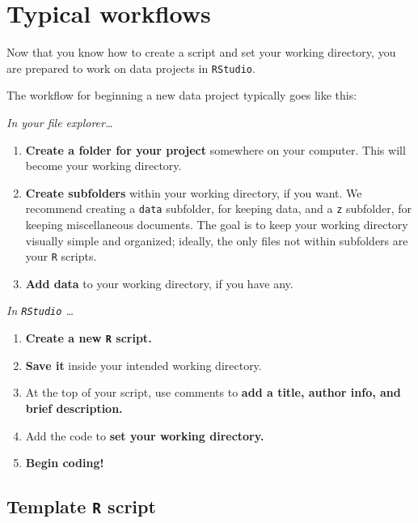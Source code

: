 \documentclass[
]{book}
\begin{document}
\hypertarget{typical-workflows}{%
\section*{Typical workflows}\label{typical-workflows}}

Now that you know how to create a script and set your working directory, you are prepared to work on data projects in \texttt{RStudio}.

The workflow for beginning a new data project typically goes like this:

\emph{In your file explorer\ldots{}}

\begin{enumerate}
\def\labelenumi{\arabic{enumi}.}
\item
  \textbf{Create a folder for your project} somewhere on your computer. This will become your working directory.
\item
  \textbf{Create subfolders} within your working directory, if you want. We recommend creating a \texttt{data} subfolder, for keeping data, and a \texttt{z} subfolder, for keeping miscellaneous documents. The goal is to keep your working directory visually simple and organized; ideally, the only files not within subfolders are your \texttt{R} scripts.
\item
  \textbf{Add data} to your working directory, if you have any.
\end{enumerate}

\emph{In \texttt{RStudio} \ldots{}}

\begin{enumerate}
\def\labelenumi{\arabic{enumi}.}
\setcounter{enumi}{3}
\item
  \textbf{Create a new \texttt{R} script.}
\item
  \textbf{Save it} inside your intended working directory.
\item
  At the top of your script, use comments to \textbf{add a title, author info, and brief description.}
\item
  Add the code to \textbf{set your working directory.}
\item
  \textbf{Begin coding!}
\end{enumerate}

\hypertarget{template-r-script}{%
\subsection*{\texorpdfstring{Template \texttt{R} script}{Template R script}}\label{template-r-script}}
\end{document}
